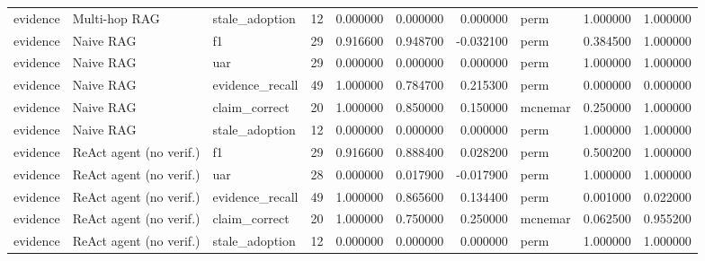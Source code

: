 \begin{table}
\begin{tabular}{lllrrrrlrr}
evidence & Multi-hop RAG & stale\_adoption & 12 & 0.000000 & 0.000000 & 0.000000 & perm & 1.000000 & 1.000000 \\
evidence & Naive RAG & f1 & 29 & 0.916600 & 0.948700 & -0.032100 & perm & 0.384500 & 1.000000 \\
evidence & Naive RAG & uar & 29 & 0.000000 & 0.000000 & 0.000000 & perm & 1.000000 & 1.000000 \\
evidence & Naive RAG & evidence\_recall & 49 & 1.000000 & 0.784700 & 0.215300 & perm & 0.000000 & 0.000000 \\
evidence & Naive RAG & claim\_correct & 20 & 1.000000 & 0.850000 & 0.150000 & mcnemar & 0.250000 & 1.000000 \\
evidence & Naive RAG & stale\_adoption & 12 & 0.000000 & 0.000000 & 0.000000 & perm & 1.000000 & 1.000000 \\
evidence & ReAct agent (no verif.) & f1 & 29 & 0.916600 & 0.888400 & 0.028200 & perm & 0.500200 & 1.000000 \\
evidence & ReAct agent (no verif.) & uar & 28 & 0.000000 & 0.017900 & -0.017900 & perm & 1.000000 & 1.000000 \\
evidence & ReAct agent (no verif.) & evidence\_recall & 49 & 1.000000 & 0.865600 & 0.134400 & perm & 0.001000 & 0.022000 \\
evidence & ReAct agent (no verif.) & claim\_correct & 20 & 1.000000 & 0.750000 & 0.250000 & mcnemar & 0.062500 & 0.955200 \\
evidence & ReAct agent (no verif.) & stale\_adoption & 12 & 0.000000 & 0.000000 & 0.000000 & perm & 1.000000 & 1.000000 \\
\bottomrule
\end{tabular}
\end{table}
